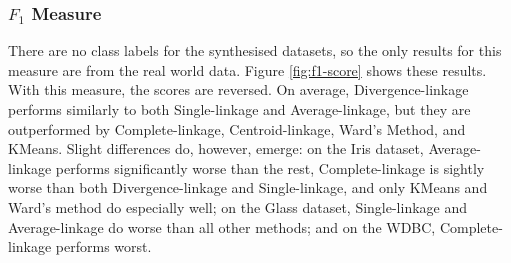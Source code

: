 \subsubsection{$F_1$ Measure}
There are no class labels for the synthesised datasets, so the only results for this measure are from the real world data.  Figure \ref{fig:f1-score} shows these results.  With this measure, the scores are reversed.  On average, Divergence-linkage performs similarly to both Single-linkage and Average-linkage, but they are outperformed by Complete-linkage, Centroid-linkage, Ward's Method, and KMeans.  Slight differences do, however, emerge: on the Iris dataset, Average-linkage performs significantly worse than the rest, Complete-linkage is sightly worse than both Divergence-linkage and Single-linkage, and only KMeans and Ward's method do especially well; on the Glass dataset, Single-linkage and Average-linkage do worse than all other methods; and on the WDBC, Complete-linkage performs worst.

